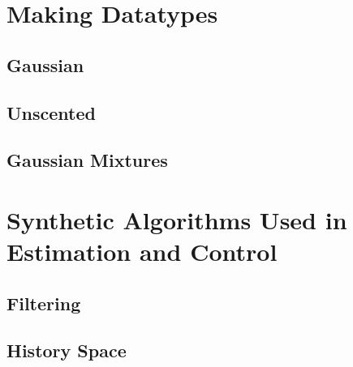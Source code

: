 \section{Making Datatypes}
\subsection{Gaussian}
\subsection{Unscented}
\subsection{Gaussian Mixtures}

\section{Synthetic Algorithms Used in Estimation and Control}
\subsection{Filtering}
\subsection{History Space}

